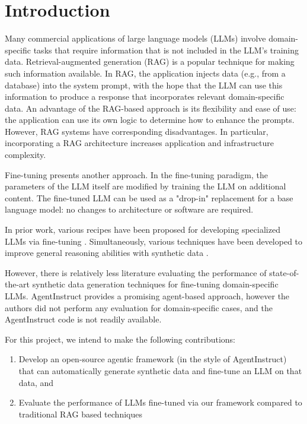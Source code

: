 \section{Introduction}
Many commercial applications of large language models (LLMs) involve
domain-specific tasks that require information that is not included in the LLM’s
training data. Retrieval-augmented generation (RAG)
\citep{lewis_retrieval-augmented_2020} is a popular technique for making such
information available. In RAG, the application injects data (e.g., from a
database) into the system prompt, with the hope that the LLM can use this
information to produce a response that incorporates relevant domain-specific
data. An advantage of the RAG-based approach is its flexibility and ease of use:
the application can use its own logic to determine how to enhance the prompts.
However, RAG systems have corresponding disadvantages. In particular,
incorporating a RAG architecture increases application and infrastructure
complexity.

Fine-tuning presents another approach. In the fine-tuning paradigm, the parameters of the LLM itself are modified by training the LLM on additional content. The fine-tuned LLM can be used as a "drop-in" replacement for a base language model: no changes to architecture or software are required.

In prior work, various recipes have been proposed for developing specialized LLMs via fine-tuning \citep{balaguer_rag_2024,yang_fingpt_2023,wu_pmc-llama_2023}. Simultaneously, various techniques have been developed to improve general reasoning abilities with synthetic data \citep{shao_synthetic_2023,wang_self-instruct_2023,mitra_agentinstruct_2024}.

However, there is relatively less literature evaluating the performance of
state-of-the-art synthetic data generation techniques for fine-tuning
domain-specific LLMs. AgentInstruct \citep{mitra_agentinstruct_2024} provides a promising
agent-based approach, however the authors did not perform any evaluation for
domain-specific cases, and the AgentInstruct code is not readily available.

For this project, we intend to make the following contributions:

\begin{enumerate}
\item Develop an open-source agentic framework (in the style of AgentInstruct)
that can automatically generate synthetic data and fine-tune an LLM on that
data, and
\item Evaluate the performance of LLMs fine-tuned via our framework compared to
traditional RAG based techniques
\end{enumerate}
